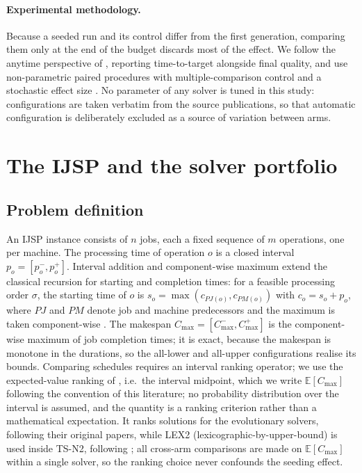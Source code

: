 \documentclass[review]{elsarticle}
\begin{document}
\paragraph{Experimental methodology.} Because a seeded run and its control
differ from the first generation, comparing them only at the end of the
budget discards most of the effect. We follow the anytime perspective of
\cite{LopezIbanez2014}, reporting time-to-target alongside final quality,
and use non-parametric paired procedures with multiple-comparison control
\cite{Derrac2011} and a stochastic effect size \cite{Vargha2000}. No
parameter of any solver is tuned in this study: configurations are taken
verbatim from the source publications, so that automatic configuration
\cite{LopezIbanez2016} is deliberately excluded as a source of variation
between arms.
\section{The IJSP and the solver portfolio}\label{sec:problem}

\subsection{Problem definition}
An IJSP instance consists of $n$ jobs, each a fixed sequence of $m$
operations, one per machine. The processing time of operation $o$ is a
closed interval $p_o=[p_o^-,p_o^+]$. Interval addition and component-wise
maximum extend the classical recursion for starting and completion times:
for a feasible processing order $\sigma$, the starting time of $o$ is
$s_o=\max(c_{PJ(o)},c_{PM(o)})$ with $c_o=s_o+p_o$, where $PJ$ and $PM$
denote job and machine predecessors and the maximum is taken
component-wise \cite{Lei2011,DiazIPMU2020}. The makespan
$C_{\max}=[C_{\max}^-,C_{\max}^+]$ is the component-wise maximum of job
completion times; it is exact, because the makespan is monotone in the
durations, so the all-lower and all-upper configurations realise its
bounds. Comparing schedules requires an interval ranking operator; we use
the expected-value ranking of \cite{Bustince2013}, i.e.\ the interval
midpoint, which we write $\mathbb{E}[C_{\max}]$ following the convention of
this literature; no probability distribution over the interval is assumed,
and the quantity is a ranking criterion rather than a mathematical
expectation. It ranks solutions for the evolutionary
solvers, following their original papers, while LEX2
(lexicographic-by-upper-bound) is used inside TS-N2, following \cite{DiazTSN2}; all
cross-arm comparisons are made on $\mathbb{E}[C_{\max}]$ within a single
solver, so the ranking choice never confounds the seeding effect.
\end{document}
